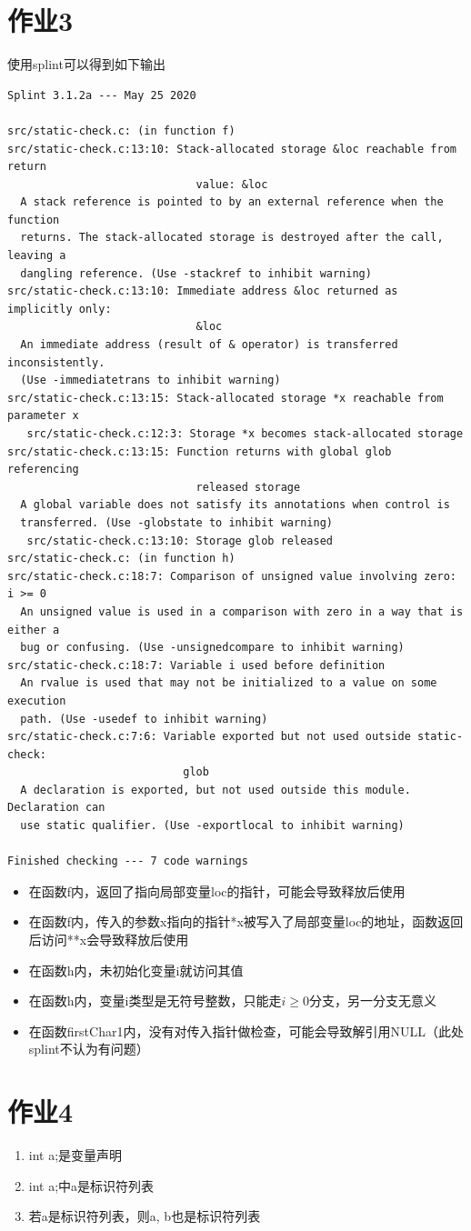 \documentclass[UTF8,a4paper,10pt]{ctexart}
\begin{document}
\section{作业3}
使用splint可以得到如下输出
\begin{verbatim}
Splint 3.1.2a --- May 25 2020

src/static-check.c: (in function f)
src/static-check.c:13:10: Stack-allocated storage &loc reachable from return
                             value: &loc
  A stack reference is pointed to by an external reference when the function
  returns. The stack-allocated storage is destroyed after the call, leaving a
  dangling reference. (Use -stackref to inhibit warning)
src/static-check.c:13:10: Immediate address &loc returned as implicitly only:
                             &loc
  An immediate address (result of & operator) is transferred inconsistently.
  (Use -immediatetrans to inhibit warning)
src/static-check.c:13:15: Stack-allocated storage *x reachable from parameter x
   src/static-check.c:12:3: Storage *x becomes stack-allocated storage
src/static-check.c:13:15: Function returns with global glob referencing
                             released storage
  A global variable does not satisfy its annotations when control is
  transferred. (Use -globstate to inhibit warning)
   src/static-check.c:13:10: Storage glob released
src/static-check.c: (in function h)
src/static-check.c:18:7: Comparison of unsigned value involving zero: i >= 0
  An unsigned value is used in a comparison with zero in a way that is either a
  bug or confusing. (Use -unsignedcompare to inhibit warning)
src/static-check.c:18:7: Variable i used before definition
  An rvalue is used that may not be initialized to a value on some execution
  path. (Use -usedef to inhibit warning)
src/static-check.c:7:6: Variable exported but not used outside static-check:
                           glob
  A declaration is exported, but not used outside this module. Declaration can
  use static qualifier. (Use -exportlocal to inhibit warning)

Finished checking --- 7 code warnings
\end{verbatim}
\begin{itemize}
  \item 在函数f内，返回了指向局部变量loc的指针，可能会导致释放后使用
  \item 在函数f内，传入的参数x指向的指针*x被写入了局部变量loc的地址，函数返回后访问**x会导致释放后使用
  \item 在函数h内，未初始化变量i就访问其值
  \item 在函数h内，变量i类型是无符号整数，只能走$i \geq 0$分支，另一分支无意义
  \item 在函数firstChar1内，没有对传入指针做检查，可能会导致解引用NULL（此处splint不认为有问题）
\end{itemize}

\section{作业4}
\begin{enumerate}
  \item int a;是变量声明
  \item int a;中a是标识符列表
  \item 若a是标识符列表，则a, b也是标识符列表
\end{enumerate}
\end{document}
